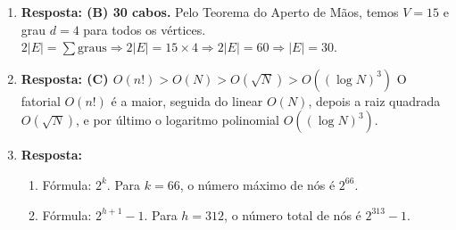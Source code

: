 \documentclass[12pt,a4paper]{article}
\begin{document}
\begin{enumerate}
\begin{enumerate}[label=\alph*)]
    \item \textbf{Passo a passo Kruskal:} \\
    (D, E) - 2: \textbf{Adicionada}. Conjuntos: \{D, E\} \\
    (A, B) - 3: \textbf{Adicionada}. Conjuntos: \{A, B\}, \{D, E\} \\
    (A, F) - 4: \textbf{Adicionada}. Conjuntos: \{A, B, F\}, \{D, E\} \\
    (B, F) - 5: \textbf{Rejeitada}. Forma ciclo A-B-F. \\
    (C, D) - 6: \textbf{Adicionada}. Conjuntos: \{A, B, F\}, \{C, D, E\} \\
    (B, C) - 7: \textbf{Adicionada}. Conjuntos: \{A, B, C, D, E, F\} \\
    Arestas restantes: (E, F)-8, (A, E)-9, (B, D)-10 são \textbf{Rejeitadas} pois a árvore já está completa.
    
    \item \textbf{Desenho da MST:}
\begin{center}
\end{center}

    \item Custo total mínimo: $2 + 3 + 4 + 6 + 7 = \textbf{22}$ (milhões de reais).
\end{enumerate}

\item \textbf{Resposta: (B) 30 cabos.}
Pelo Teorema do Aperto de Mãos, temos $V = 15$ e grau $d = 4$ para todos os vértices.
$2|E| = \sum \text{graus} \Rightarrow 2|E| = 15 \times 4 \Rightarrow 2|E| = 60 \Rightarrow |E| = 30$.

\item \textbf{Resposta: (C) $O(n!) > O(N) > O(\sqrt{N}) > O((\log N)^3)$}
O fatorial $O(n!)$ é a maior, seguida do linear $O(N)$, depois a raiz quadrada $O(\sqrt{N})$, e por último o logaritmo polinomial $O((\log N)^3)$.

\item \textbf{Resposta:}
\begin{enumerate}[label=\alph*)]
    \item Fórmula: $2^k$. Para $k=66$, o número máximo de nós é \textbf{$2^{66}$}.
    \item Fórmula: $2^{h+1} - 1$. Para $h=312$, o número total de nós é \textbf{$2^{313} - 1$}.
\end{enumerate}

\end{enumerate}
\end{document}
